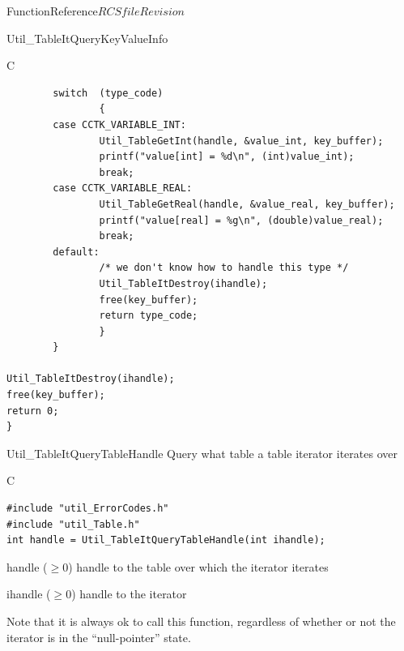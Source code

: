 \begin{cactuspart}{FunctionReference}{$RCSfile$}{$Revision$}
\begin{FunctionDescription}{Util\_TableItQueryKeyValueInfo}
\begin{ExampleSection}
\begin{Example}{C}
\begin{verbatim}
        switch  (type_code)
                {
        case CCTK_VARIABLE_INT:
                Util_TableGetInt(handle, &value_int, key_buffer);
                printf("value[int] = %d\n", (int)value_int);
                break;
        case CCTK_VARIABLE_REAL:
                Util_TableGetReal(handle, &value_real, key_buffer);
                printf("value[real] = %g\n", (double)value_real);
                break;
        default:
                /* we don't know how to handle this type */
                Util_TableItDestroy(ihandle);
                free(key_buffer);
                return type_code;
                }
        }

Util_TableItDestroy(ihandle);
free(key_buffer);
return 0;
}
\end{verbatim}
\end{Example}
\end{ExampleSection}
\end{FunctionDescription}


\begin{FunctionDescription}{Util\_TableItQueryTableHandle}
\label{Util-TableItQueryTableHandle}
Query what table a table iterator iterates over

\begin{SynopsisSection}
\begin{Synopsis}{C}
\begin{verbatim}
#include "util_ErrorCodes.h"
#include "util_Table.h"
int handle = Util_TableItQueryTableHandle(int ihandle);
\end{verbatim}
\end{Synopsis}
\end{SynopsisSection}

\begin{ResultSection}
\begin{Result}{handle ($\ge 0$)}
handle to the table over which the iterator iterates
\end{Result}
\end{ResultSection}

\begin{ParameterSection}
\begin{Parameter}{ihandle ($\ge 0$)}
handle to the iterator
\end{Parameter}
\end{ParameterSection}

\begin{Discussion}
Note that it is always ok to call this function, regardless of
whether or not the iterator is in the ``null-pointer'' state.


\end{Discussion}
\end{FunctionDescription}
\end{cactuspart}
